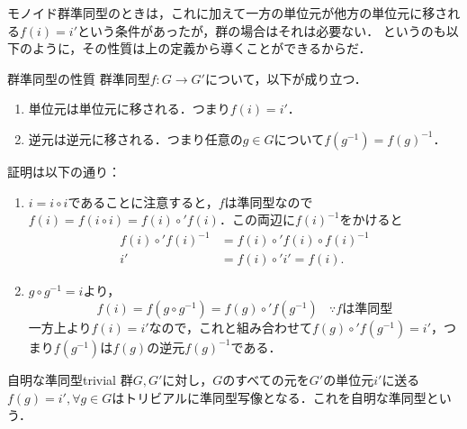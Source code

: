 \documentclass[11pt,a4paper, dvipdfmx]{jsarticle}
\begin{document}
モノイド群準同型のときは，これに加えて一方の単位元が他方の単位元に移される$f(i) = i'$という条件があったが，群の場合はそれは必要ない．
というのも以下のように，その性質は上の定義から導くことができるからだ．

\begin{prop}{群準同型の性質}{}
 群準同型$f:G \to G'$について，以下が成り立つ．
 \begin{enumerate}
  \item 単位元は単位元に移される．つまり$f(i) = i'$．
  \item 逆元は逆元に移される．つまり任意の$g \in G$について$f(g^{-1}) = f(g)^{-1}$．
 \end{enumerate}
\end{prop}
証明は以下の通り：
 \begin{enumerate}
  \item $i = i \circ i$であることに注意すると，$f$は準同型なので$f(i) = f(i \circ i) = f(i) \circ' f(i)$．この両辺に$f(i)^{-1}$をかけると
	\begin{align*}
	 f(i) \circ' f(i)^{-1} &= f(i) \circ' f(i) \circ f(i)^{-1} \\ 
	 i' &=   f(i) \circ' i' = f(i).
	\end{align*}
  \item $g \circ g^{-1} = i$より，
	\[ f(i) = f(g \circ g^{-1}) = f(g) \circ' f(g^{-1}) \ \ \ \ \because f\text{は準同型}	\]
	一方上より$f(i) = i'$なので，これと組み合わせて$f(g) \circ' f(g^{-1}) = i'$，つまり$f(g^{-1})$は$f(g)$の逆元$f(g)^{-1}$である．
 \end{enumerate}
 

\begin{rei}{自明な準同型}{trivial}
    群$G, G'$に対し，$G$のすべての元を$G'$の単位元$i'$に送る$f(g) = i', \forall g \in G$はトリビアルに準同型写像となる．これを自明な準同型という．
\end{rei}
\end{document}
